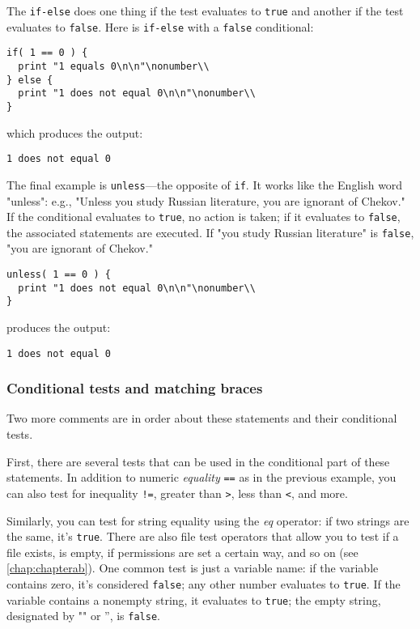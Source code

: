 The \verb|if-else| does one thing if the test evaluates to \verb|true| and another if the test evaluates to \verb|false|. Here is \verb|if-else| with a \verb|false| conditional: 

\begin{lstlisting}
if( 1 == 0 ) {
  print "1 equals 0\n\n"\nonumber\\
} else {
  print "1 does not equal 0\n\n"\nonumber\\
}
\end{lstlisting}

which produces the output:

\begin{lstlisting}
1 does not equal 0
\end{lstlisting}

The final example is \verb|unless|—the opposite of \verb|if|. It works like the English word "unless": e.g., "Unless you study Russian literature, you are ignorant of Chekov." If the conditional evaluates to \verb|true|, no action is taken; if it evaluates to \verb|false|, the associated statements are executed. If "you study Russian literature" is \verb|false|, "you are ignorant of Chekov." 

\begin{lstlisting}
unless( 1 == 0 ) {
  print "1 does not equal 0\n\n"\nonumber\\
}
\end{lstlisting}

produces the output:

\begin{lstlisting}
1 does not equal 0
\end{lstlisting}

\subsubsection{Conditional tests and matching braces}
Two more comments are in order about these statements and their conditional tests.

First, there are several tests that can be used in the conditional part of these statements. In addition to numeric \textit{equality} \verb|==| as in the previous example, you can also test for inequality \verb|!=|, greater than \verb|>|, less than \verb|<|, and more.

Similarly, you can test for string equality using the \textit{eq} operator: if two strings are the same, it's \verb|true|. There are also file test operators that allow you to test if a file exists, is empty, if permissions are set a certain way, and so on (see \autoref{chap:chapterab}). One common test is just a variable name: if the variable contains zero, it's considered \verb|false|; any other number evaluates to \verb|true|. If the variable contains a nonempty string, it evaluates to \verb|true|; the empty string, designated by "" or '', is \verb|false|.

